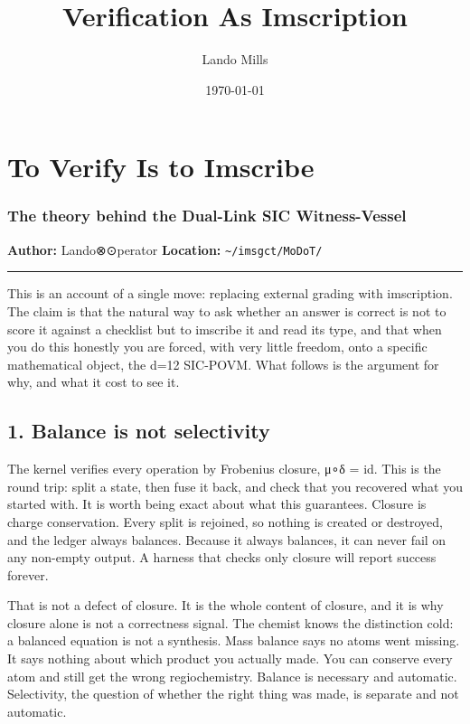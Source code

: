 \documentclass[12pt,a4paper]{article}
\title{Verification As Imscription}
\date{\today}
\author{Lando Mills}
\begin{document}
\maketitle
\hypertarget{to-verify-is-to-imscribe}{%
\section{To Verify Is to Imscribe}\label{to-verify-is-to-imscribe}}

\hypertarget{the-theory-behind-the-dual-link-sic-witness-vessel}{%
\subsubsection{The theory behind the Dual-Link SIC
Witness-Vessel}\label{the-theory-behind-the-dual-link-sic-witness-vessel}}

\textbf{Author:} Lando⊗⊙perator \textbf{Location:}
\texttt{\textasciitilde{}/imsgct/MoDoT/}

\begin{center}\rule{0.5\linewidth}{0.5pt}\end{center}

This is an account of a single move: replacing external grading with
imscription. The claim is that the natural way to ask whether an answer
is correct is not to score it against a checklist but to imscribe it and
read its type, and that when you do this honestly you are forced, with
very little freedom, onto a specific mathematical object, the d=12
SIC-POVM. What follows is the argument for why, and what it cost to see
it.

\hypertarget{balance-is-not-selectivity}{%
\subsection{1. Balance is not
selectivity}\label{balance-is-not-selectivity}}

The kernel verifies every operation by Frobenius closure, μ∘δ = id. This
is the round trip: split a state, then fuse it back, and check that you
recovered what you started with. It is worth being exact about what this
guarantees. Closure is charge conservation. Every split is rejoined, so
nothing is created or destroyed, and the ledger always balances. Because
it always balances, it can never fail on any non-empty output. A harness
that checks only closure will report success forever.

That is not a defect of closure. It is the whole content of closure, and
it is why closure alone is not a correctness signal. The chemist knows
the distinction cold: a balanced equation is not a synthesis. Mass
balance says no atoms went missing. It says nothing about which product
you actually made. You can conserve every atom and still get the wrong
regiochemistry. Balance is necessary and automatic. Selectivity, the
question of whether the right thing was made, is separate and not
automatic.
\end{document}
